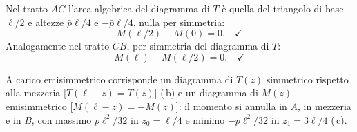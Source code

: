 \begin{esempio}
\begin{svolgimento}
		Nel tratto $AC$ l'area algebrica del diagramma
		di $T$ è quella del triangolo di base $\ell/2$
		e altezze $\bar{p}\ell/4$ e $-\bar{p}\ell/4$,
		nulla per simmetria:
		\[
		M(\ell/2) - M(0) = 0. \quad\checkmark
		\]
		Analogamente nel tratto $CB$, per simmetria
		del diagramma di $T$:
		\[
		M(\ell) - M(\ell/2) = 0. \quad\checkmark
		\]
		
		\noindent
		A carico emisimmetrico corrisponde un diagramma
		di $T(z)$ simmetrico rispetto alla mezzeria
		[$T(\ell-z) = T(z)$] (\,b) e un diagramma di $M(z)$
		emisimmetrico [$M(\ell-z) = -M(z)$]: il momento
		si annulla in $A$, in mezzeria e in $B$, con
		massimo $\bar{p}\ell^2/32$ in $z_0 = \ell/4$
		e minimo $-\bar{p}\ell^2/32$ in $z_1 = 3\ell/4$ (\,c).
		
	\end{svolgimento}
\end{esempio}


